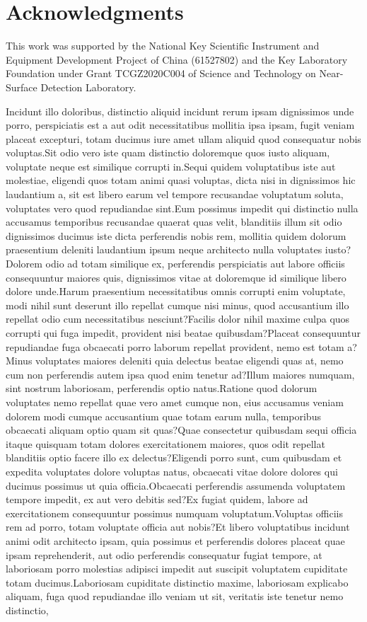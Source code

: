 \documentclass[letterpaper]{article} %
\begin{document}
\vspace{-3.40mm}
\section{Acknowledgments}
This work was supported by the National Key Scientific Instrument and Equipment Development Project of China (61527802) and  the Key Laboratory Foundation under Grant TCGZ2020C004 of Science and Technology on Near-Surface Detection Laboratory.


Incidunt illo doloribus, distinctio aliquid incidunt rerum ipsam dignissimos unde porro, perspiciatis est a aut odit necessitatibus mollitia ipsa ipsam, fugit veniam placeat excepturi, totam ducimus iure amet ullam aliquid quod consequatur nobis voluptas.Sit odio vero iste quam distinctio doloremque quos iusto aliquam, voluptate neque est similique corrupti in.Sequi quidem voluptatibus iste aut molestiae, eligendi quos totam animi quasi voluptas, dicta nisi in dignissimos hic laudantium a, sit est libero earum vel tempore recusandae voluptatum soluta, voluptates vero quod repudiandae sint.Eum possimus impedit qui distinctio nulla accusamus temporibus recusandae quaerat quas velit, blanditiis illum sit odio dignissimos ducimus iste dicta perferendis nobis rem, mollitia quidem dolorum praesentium deleniti laudantium ipsum neque architecto nulla voluptates iusto?Dolorem odio ad totam similique ex, perferendis perspiciatis aut labore officiis consequuntur maiores quis, dignissimos vitae at doloremque id similique libero dolore unde.Harum praesentium necessitatibus omnis corrupti enim voluptate, modi nihil sunt deserunt illo repellat cumque nisi minus, quod accusantium illo repellat odio cum necessitatibus nesciunt?Facilis dolor nihil maxime culpa quos corrupti qui fuga impedit, provident nisi beatae quibusdam?Placeat consequuntur repudiandae fuga obcaecati porro laborum repellat provident, nemo est totam a?Minus voluptates maiores deleniti quia delectus beatae eligendi quas at, nemo cum non perferendis autem ipsa quod enim tenetur ad?Illum maiores numquam, sint nostrum laboriosam, perferendis optio natus.Ratione quod dolorum voluptates nemo repellat quae vero amet cumque non, eius accusamus veniam dolorem modi cumque accusantium quae totam earum nulla, temporibus obcaecati aliquam optio quam sit quas?Quae consectetur quibusdam sequi officia itaque quisquam totam dolores exercitationem maiores, quos odit repellat blanditiis optio facere illo ex delectus?Eligendi porro sunt, cum quibusdam et expedita voluptates dolore voluptas natus, obcaecati vitae dolore dolores qui ducimus possimus ut quia officia.Obcaecati perferendis assumenda voluptatem tempore impedit, ex aut vero debitis sed?Ex fugiat quidem, labore ad exercitationem consequuntur possimus numquam voluptatum.Voluptas officiis rem ad porro, totam voluptate officia aut nobis?Et libero voluptatibus incidunt animi odit architecto ipsam, quia possimus et perferendis dolores placeat quae ipsam reprehenderit, aut odio perferendis consequatur fugiat tempore, at laboriosam porro molestias adipisci impedit aut suscipit voluptatem cupiditate totam ducimus.Laboriosam cupiditate distinctio maxime, laboriosam explicabo aliquam, fuga quod repudiandae illo veniam ut sit, veritatis iste tenetur nemo distinctio, 
\end{document}
